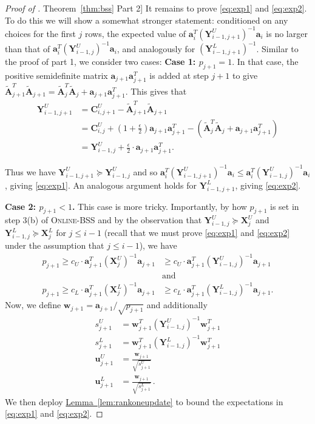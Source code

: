 \documentclass[11pt]{article}
\numberwithin{equation}{section}
\theoremstyle{definition}
\theoremstyle{plain}
\newcommand{\expref}[2]{\hyperref[#2]{#1~\ref{#2}}}
\newcommand{\bv}[1]{\mathbf{#1}}
\begin{document}
\begin{proof}[Proof of \expref{Theorem}{thm:bss} Part 2]
It remains to prove \eqref{eq:exp1} and \eqref{eq:exp2}.
To do this we will show a somewhat stronger statement: conditioned on any choices for the first $j$ rows, the expected value of $\bv{a}_i^T (\bv{Y}^U_{i-1,j+1})^{-1} \bv{a}_i$ is no larger than that of $\bv{a}_i^T (\bv{Y}^U_{i-1,j})^{-1} \bv{a}_i$, and analogously for $(\bv{Y}^L_{i-1,j+1})^{-1}$.
Similar to the proof of part 1, we consider two cases:
\textbf{Case 1: $p_{j+1} = 1$}.  In that case, the positive semidefinite matrix $\bv{a}_{j+1} \bv{a}_{j+1}^T$ is added at step $j+1$ to give $\bv{\tilde A}_{j+1}^T \bv{\tilde A}_{j+1} = \bv{\tilde A}_{j}^T \bv{\tilde A}_{j} + \bv{a}_{j+1} \bv{a}_{j+1}^T.$ This gives that 
\begin{align*}
\bv{Y}^U_{i-1,j+1} &= \bv{C}_{i,j+1}^U - \bv{\tilde A}_{j+1}^T \bv{\tilde A}_{j+1}\\
 &= \bv{C}_{i,j}^U + \left (1 + \frac{\epsilon}{2} \right ) \bv{a}_{j+1} \bv{a}_{j+1}^T - (\bv{\tilde A}_{j}^T \bv{\tilde A}_{j}  +\bv{a}_{j+1} \bv{a}_{j+1}^T)\\
 & = \bv{Y}^U_{i-1,j}  +  \frac{\epsilon}{2} \cdot \bv{a}_{j+1} \bv{a}_{j+1}^T.
\end{align*}

Thus we have $\bv{Y}^U_{i-1,j+1} \succeq \bv{Y}^U_{i-1,j}$ and so $\bv{a}_i^T (\bv{Y}^U_{i-1,j+1})^{-1} \bv{a}_i \le \bv{a}_i^T (\bv{Y}^U_{i-1,j})^{-1} \bv{a}_i$, giving \eqref{eq:exp1}. An analogous argument holds for $\bv{Y}^L_{i-1,j+1}$, giving \eqref{eq:exp2}. 

%

\textbf{Case 2: $p_{j+1} < 1$.} This case is more tricky.  %
Importantly, by how $p_{j+1}$ is set in step 3(b) of \textsc{Online-BSS} and by the observation that $\bv{Y}^U_{i-1,j} \succeq \bv{X}^U_j$ and $\bv{Y}^L_{i-1,j} \succeq \bv{X}^L_j$ for $j \le i-1$ (recall that we must prove \eqref{eq:exp1} and \eqref{eq:exp2} under the assumption that $j \le i-1$), 
we have %
\begin{align}
p_{j+1} \geq c_U \cdot \bv{a}_{j+1}^T (\bv{X}^U_j)^{-1} \bv{a}_{j+1} &\geq c_U \cdot  \bv{a}_{j+1}^T (\bv{Y}^U_{i-1,j})^{-1} \bv{a}_{j+1} \label{eq:cuBound}\\
&\text{and}\nonumber\\
p_{j+1} \geq c_L \cdot \bv{a}_{j+1}^T (\bv{X}^L_j)^{-1} \bv{a}_{j+1} &\geq c_L\cdot \bv{a}_{j+1}^T (\bv{Y}^L_{i-1,j})^{-1} \bv{a}_{j+1}\label{eq:clBound}.
\end{align}
%
%
%
%
%
%
Now, we define $\bv{w}_{j+1} ={\bv{a}_{j+1}}/{\sqrt{p_{j+1}}}$ and additionally
\begin{align*}
s^U_{j+1} &= \bv{w}_{j+1}^T (\bv{Y}^U_{i-1,j})^{-1} \bv{w}_{j+1}^T \\
s^L_{j+1} &= \bv{w}_{j+1}^T (\bv{Y}^L_{i-1,j})^{-1} \bv{w}_{j+1}^T \\
\bv{u}^U_{j+1} &= \frac{\bv{w}_{j+1}}{\sqrt{s^U_{j+1}}} \\
\bv{u}^L_{j+1} &= \frac{\bv{w}_{j+1}}{\sqrt{s^L_{j+1}}}\,.
\end{align*}
We then deploy \expref{Lemma}{lem:rankoneupdate} to bound the expectations in \eqref{eq:exp1} and \eqref{eq:exp2}.  


\end{proof}
\end{document}
